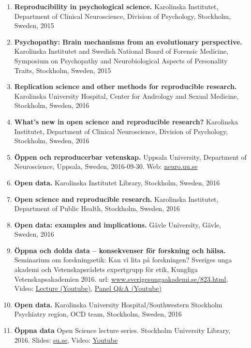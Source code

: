 \documentclass[10pt]{article}
\begin{document}
\begin{enumerate}[nolistsep]
\item \textbf{Reproducibility in psychological science.} Karolinska Institutet, Department of Clinical Neuroscience, Division of Psychology, Stockholm, Sweden, 2015
\item \textbf{Psychopathy: Brain mechanisms from an evolutionary perspective.} Karolinska Institutet and Swedish National Board of Forensic Medicine, Symposium on Psychopathy and Neurobiological Aspects of Personality Traits, Stockholm, Sweden, 2015
\item \textbf{Replication science and other methods for reproducible research.} Karolinska University Hospital, Center for Andrology and Sexual Medicine, Stockholm, Sweden, 2016
\item \textbf{What’s new in open science and reproducible research?} Karolinska Institutet, Department of Clinical Neuroscience, Division of Psychology, Stockholm, Sweden, 2016
\item \textbf{Öppen och reproducerbar vetenskap.} Uppsala University, Department of Neuroscience, Uppsala, Sweden, 2016-09-30.
Web: \href{http://www.neuro.uu.se/kalendarium/kalendarium-detaljsida/?eventId=20518}{neuro.uu.se}
\item \textbf{Open data.} Karolinska Institutet Library, Stockholm, Sweden, 2016
\item \textbf{Open science and reproducible research.} Karolinska Institutet, Department of Public Health, Stockholm, Sweden, 2016
\item \textbf{Open data: examples and implications.} Gävle University, Gävle, Sweden, 2016
\item \textbf{Öppna och dolda data – konsekvenser för forskning och hälsa.} Seminarium om forskningsetik: Kan vi lita på forskningen? Sveriges unga akademi och Vetenskapsrådets expertgrupp för etik, Kungliga Vetenskapsakademien 2016.
url: \href{http://www.sverigesungaakademi.se/823.html}{www.sverigesungaakademi.se/823.html}, 
Video: \href{https://www.youtube.com/watch?v=VLYBNdt0neo}{Lecture (Youtube)}, \href{https://www.youtube.com/watch?v=2noejs93mY8}{Panel Q\&A (Youtube)}
\item \textbf{Open data.} Karolinska University Hospital/Southwestern Stockholm Psychiatry region, OCD team, Stockholm, Sweden, 2016
\item \textbf{Öppna data} Open Science lecture series. Stockholm University Library, 2016.
Slides: \href{http://su.se/polopoly_fs/1.308713.1479911338!/menu/standard/file/\%C3\%96ppna\%20data\%20SU-biblioteket\%20161122.pptx}{su.se}, 
Video: \href{https://www.youtube.com/watch?v=1azYwpiAunA}{Youtube}

\end{enumerate}
\end{document}
